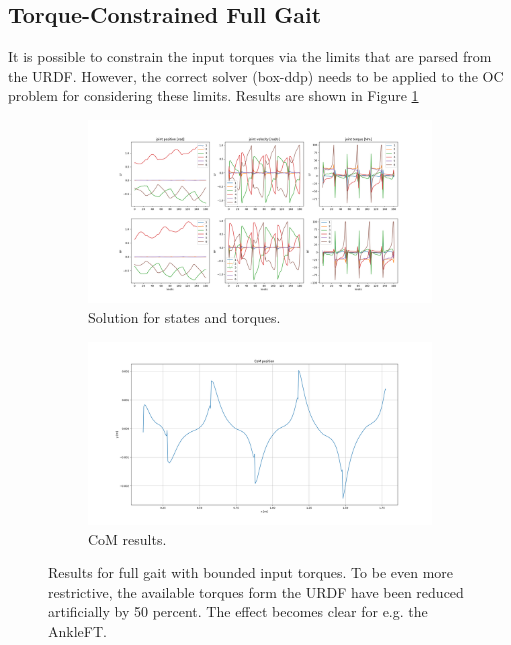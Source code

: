 \subsection{Torque-Constrained Full Gait}
It is possible to constrain the input torques via the limits that are parsed from the URDF. However, the correct solver (box-ddp) needs to be applied to the OC problem for considering these limits.  Results are shown in Figure \ref{fig:rh5_constrain_torque}
\begin{figure}[h!]
\centering
\begin{subfigure}{1\textwidth}
  \centering
  \includegraphics[width=1\linewidth]{Media/Crocoddyl/RH5Legs/BoundedInput/RH5GaitUbound50Percent_Solution.png}
  \caption{Solution for states and torques.}
\end{subfigure}
\begin{subfigure}{1\textwidth}
  \centering
\includegraphics[width=1\linewidth]{Media/Crocoddyl/RH5Legs/BoundedInput/RH5GaitUbound50Percent_CoM.png}
\caption{CoM results.}
\end{subfigure}
\caption{Results for full gait with bounded input torques. To be even more restrictive, the available torques form the URDF have been reduced artificially by 50 percent. The effect becomes clear for e.g. the AnkleFT.}
\label{fig:rh5_constrain_torque}
\centering
\end{figure}

